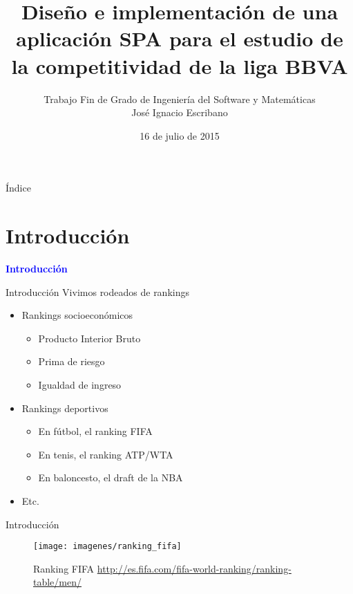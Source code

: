 \documentclass[10pt,hyperref={unicode}]{beamer}
\author[José Ignacio Escribano]{Trabajo Fin de Grado de Ingeniería del Software y Matemáticas \\ \vspace*{1em} José Ignacio Escribano}
\title[Trabajo Fin de Grado]{Diseño e implementación de una aplicación SPA para el estudio de la competitividad de la liga BBVA}
\date{16 de julio de 2015}
\institute[URJC]{\texttt{[image: imagenes/logoURJC.jpg]}}
\begin{document}
	
	\begin{frame}
		\maketitle
	\end{frame}

	\begin{frame}[allowframebreaks]{Índice}
		\tableofcontents
	\end{frame}
	
	
	\section{Introducción}
	
	\begin{frame}
		\begin{center}
			\Huge\textbf{\textsf{\textcolor{blue}{Introducción}}}
		\end{center}
	\end{frame}
	
	\begin{frame}{Introducción}
		Vivimos rodeados de rankings
		
		\begin{itemize}
			\item Rankings socioeconómicos
			\begin{itemize}
				\item Producto Interior Bruto
				\item Prima de riesgo
				\item Igualdad de ingreso
			\end{itemize}
			\item Rankings deportivos
			\begin{itemize}
				\item En fútbol, el ranking FIFA
				\item En tenis, el ranking ATP/WTA
				\item En baloncesto, el draft de la NBA
			\end{itemize}
			\item Etc.
		\end{itemize}
	\end{frame}
	
	\begin{frame}{Introducción}
		\begin{figure}
			\centering
			\texttt{[image: imagenes/ranking\_fifa]}
			\caption{Ranking FIFA \url{http://es.fifa.com/fifa-world-ranking/ranking-table/men/}}
			\label{fig:ranking_fifa}
		\end{figure}
	\end{frame}
	
\end{document}
